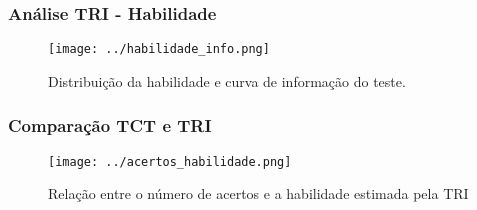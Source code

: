 \documentclass{beamer}
\begin{document}
	\begin{frame}
		
		\frametitle{Análise TRI - Habilidade}
		\begin{figure}
			\caption{Distribuição da habilidade e curva de informação do teste.}
		    \texttt{[image: ../habilidade\_info.png]}
		\end{figure}
		
	\end{frame}	
	
	\begin{frame}
		
	\frametitle{Comparação TCT e TRI}
		\begin{figure}
			\caption{Relação entre o número de acertos e a habilidade estimada pela TRI}
			\texttt{[image: ../acertos\_habilidade.png]}
		\end{figure}
		
	\end{frame}	
	
\end{document}
